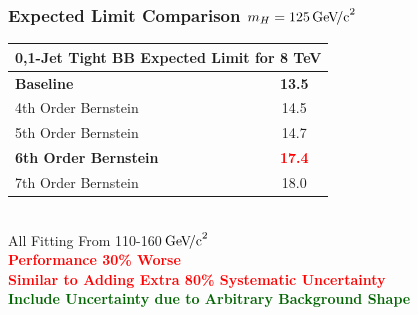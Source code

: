 \documentclass{beamer}
\newcommand{\GeVcc}{\ensuremath{\,\mathrm{Ge\kern -0.1em V\!/c}^2}}
\newcommand{\tredbf}[1]{\textcolor{red}{\bf #1}}
\newcommand{\tgreenbf}[1]{\textcolor{darkgreen}{\bf #1}}
\begin{document}
\begin{frame}
\frametitle{Expected Limit Comparison $m_H=125\GeVcc{}$}
\begin{center}
\begin{tabular}{|l|c|} \hline
\multicolumn{2}{|c|}{ \bf 0,1-Jet Tight BB Expected Limit for 8 TeV} \\ \hline
\bf Baseline          &      \bf 13.5   \\ \hline
4th Order Bernstein         & 14.5        \\ \hline
5th Order Bernstein         & 14.7        \\ \hline
\bf 6th Order Bernstein         & \tredbf{17.4}        \\ \hline
7th Order Bernstein         & 18.0        \\ \hline
\end{tabular}
\\
All Fitting From 110-160\GeVcc{}
\\ \vspace{1em}
\large
\tredbf{
Performance 30\% Worse
\\
Similar to Adding Extra 80\% Systematic Uncertainty
}
\\
\tgreenbf{Include Uncertainty due to Arbitrary Background Shape}
\end{center}
\end{frame}
\end{document}

